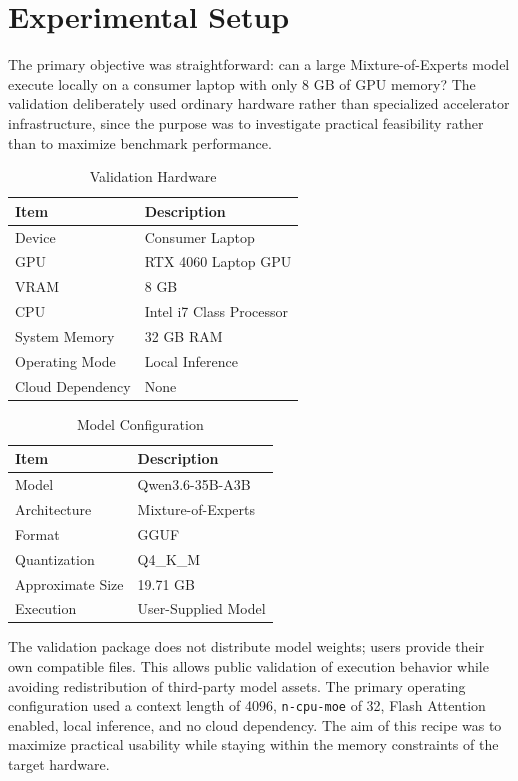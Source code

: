 \documentclass[11pt]{article}
\begin{document}
\section{Experimental Setup}

The primary objective was straightforward: can a large Mixture-of-Experts model execute locally on a consumer laptop with only 8 GB of GPU memory? The validation deliberately used ordinary hardware rather than specialized accelerator infrastructure, since the purpose was to investigate practical feasibility rather than to maximize benchmark performance.

\begin{table}[h]
\centering
\begin{tabular}{ll}
\toprule
Item & Description \\
\midrule
Device & Consumer Laptop \\
GPU & RTX 4060 Laptop GPU \\
VRAM & 8 GB \\
CPU & Intel i7 Class Processor \\
System Memory & 32 GB RAM \\
Operating Mode & Local Inference \\
Cloud Dependency & None \\
\bottomrule
\end{tabular}
\caption{Validation Hardware}
\end{table}

\begin{table}[h]
\centering
\begin{tabular}{ll}
\toprule
Item & Description \\
\midrule
Model & Qwen3.6-35B-A3B \\
Architecture & Mixture-of-Experts \\
Format & GGUF \\
Quantization & Q4\_K\_M \\
Approximate Size & 19.71 GB \\
Execution & User-Supplied Model \\
\bottomrule
\end{tabular}
\caption{Model Configuration}
\end{table}

The validation package does not distribute model weights; users provide their own compatible files. This allows public validation of execution behavior while avoiding redistribution of third-party model assets. The primary operating configuration used a context length of 4096, \texttt{n-cpu-moe} of 32, Flash Attention enabled, local inference, and no cloud dependency. The aim of this recipe was to maximize practical usability while staying within the memory constraints of the target hardware.
\end{document}
